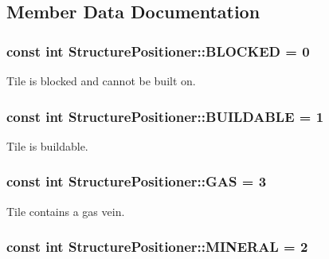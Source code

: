 \subsection{Member Data Documentation}
\hypertarget{class_structure_positioner_a808a58757b50522f54517ebe0f53f884}{
\subsubsection[{B\-L\-O\-C\-K\-E\-D}]{\setlength{\rightskip}{0pt plus 5cm}const int Structure\-Positioner\-::\-B\-L\-O\-C\-K\-E\-D = 0\hspace{0.3cm}{\ttfamily [static]}}}\label{class_structure_positioner_a808a58757b50522f54517ebe0f53f884}
Tile is blocked and cannot be built on. \hypertarget{class_structure_positioner_a52b8f5eec2db29464b7e7da910031cda}{
\subsubsection[{B\-U\-I\-L\-D\-A\-B\-L\-E}]{\setlength{\rightskip}{0pt plus 5cm}const int Structure\-Positioner\-::\-B\-U\-I\-L\-D\-A\-B\-L\-E = 1\hspace{0.3cm}{\ttfamily [static]}}}\label{class_structure_positioner_a52b8f5eec2db29464b7e7da910031cda}
Tile is buildable. \hypertarget{class_structure_positioner_aed20514df64d4a4ef64fa124b2709140}{
\subsubsection[{G\-A\-S}]{\setlength{\rightskip}{0pt plus 5cm}const int Structure\-Positioner\-::\-G\-A\-S = 3\hspace{0.3cm}{\ttfamily [static]}}}\label{class_structure_positioner_aed20514df64d4a4ef64fa124b2709140}
Tile contains a gas vein. \hypertarget{class_structure_positioner_a62fd11d736c0792adbe85ad1da4d9b48}{
\subsubsection[{M\-I\-N\-E\-R\-A\-L}]{\setlength{\rightskip}{0pt plus 5cm}const int Structure\-Positioner\-::\-M\-I\-N\-E\-R\-A\-L = 2\hspace{0.3cm}{\ttfamily [static]}}}\label{class_structure_positioner_a62fd11d736c0792adbe85ad1da4d9b48}
